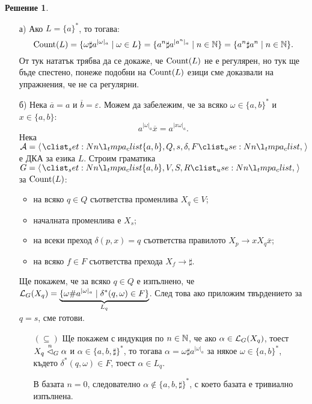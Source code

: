 \documentclass{article}
\theoremstyle{definition}
\newtheorem*{solution}{Решение}
\begin{document}
\begin{solution}
    \phantom{}
    \begin{itemize}
        \item[а)] Ако $L = \{ a \}^*$, то тогава:
              \[
                  \operatorname{Count}(L) = \{ \omega \sharp a^{|\omega|_a} \mid \omega \in L \} = \{ a^n \sharp a^{|a^n|_a} \mid n \in \mathbb{N} \} = \{ a^n \sharp a^n \mid n \in \mathbb{N} \}.
              \]
              От тук нататък трябва да се докаже, че $\operatorname{Count}(L)$ не е регулярен, но тук ще бъде спестено, понеже подобни на $\operatorname{Count}(L)$ езици сме доказвали на упражнения, че не са регулярни.
        \item[б)]
              Нека $\overline{a} = a$ и $\overline{b} = \varepsilon$.
              Можем да забележим, че за всяко $\omega \in \{ a, b \}^*$ и $x \in \{ a, b \}$:
              \[
                  a^{|\omega|_a} \overline{x} = a^{|x \omega|_a}.
              \]
              Нека $\A = \opair{\{ a, b \}, Q, s, \delta, F}$ е ДКА за езика $L$.
              Строим граматика $G = \opair{\{ a, b \}, V, S, R}$ за $\operatorname{Count}(L)$:
              \begin{itemize}
                  \item на всяко $q \in Q$ съответства променлива $X_q \in V$;
                  \item началната променлива е $X_s$;
                  \item на всеки преход $\delta(p, x) = q$ съответства правилото $X_p \rightarrow x X_q \overline{x}$;
                  \item на всяко $f \in F$ съответства прехода $X_f \rightarrow \sharp$.
              \end{itemize}
              Ще покажем, че за всяко $q \in Q$ е изпълнено, че $\mathcal{L}_G(X_q) = \underbrace{\{ \omega \# a^{|\omega|_a} \mid \delta^*(q, \omega) \in F \}}_{L_q}$.
              След това ако приложим твърдението за $q = s$, сме готови.
              \begin{itemize}
                  \item[$(\subseteq)$] Ще покажем с индукция по $n \in \mathbb{N}$, че ако $\alpha \in \mathcal{L}_G(X_q)$, тоест $X_q \stackrel{n}{\vartriangleleft}_G \alpha$ и $\alpha \in \{ a, b, \sharp \}^*$, то тогава $\alpha = \omega \sharp a^{|\omega|_a}$ за някое $\omega \in \{ a, b \}^*$, където $\delta^*(q, \omega) \in F$, тоест $\alpha \in L_q$.

                        В базата $n = 0$, следователно $\alpha \notin \{ a, b, \sharp \}^*$, с което базата е тривиално изпълнена.


\end{itemize}
\end{itemize}
\end{solution}
\end{document}
